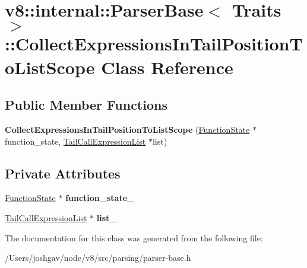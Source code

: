 \hypertarget{classv8_1_1internal_1_1_parser_base_1_1_collect_expressions_in_tail_position_to_list_scope}{}\section{v8\+:\+:internal\+:\+:Parser\+Base$<$ Traits $>$\+:\+:Collect\+Expressions\+In\+Tail\+Position\+To\+List\+Scope Class Reference}
\label{classv8_1_1internal_1_1_parser_base_1_1_collect_expressions_in_tail_position_to_list_scope}
\subsection*{Public Member Functions}
\begin{DoxyCompactItemize}
\item 
{\bfseries Collect\+Expressions\+In\+Tail\+Position\+To\+List\+Scope} (\hyperlink{classv8_1_1internal_1_1_function_state}{Function\+State} $\ast$function\+\_\+state, \hyperlink{classv8_1_1internal_1_1_parser_base_1_1_tail_call_expression_list}{Tail\+Call\+Expression\+List} $\ast$list)\hypertarget{classv8_1_1internal_1_1_parser_base_1_1_collect_expressions_in_tail_position_to_list_scope_a7edcb8e37de61eb181538833760d8982}{}\label{classv8_1_1internal_1_1_parser_base_1_1_collect_expressions_in_tail_position_to_list_scope_a7edcb8e37de61eb181538833760d8982}

\end{DoxyCompactItemize}
\subsection*{Private Attributes}
\begin{DoxyCompactItemize}
\item 
\hyperlink{classv8_1_1internal_1_1_function_state}{Function\+State} $\ast$ {\bfseries function\+\_\+state\+\_\+}\hypertarget{classv8_1_1internal_1_1_parser_base_1_1_collect_expressions_in_tail_position_to_list_scope_a453bc3a3e8499fe106b498f99bc0fc5a}{}\label{classv8_1_1internal_1_1_parser_base_1_1_collect_expressions_in_tail_position_to_list_scope_a453bc3a3e8499fe106b498f99bc0fc5a}

\item 
\hyperlink{classv8_1_1internal_1_1_parser_base_1_1_tail_call_expression_list}{Tail\+Call\+Expression\+List} $\ast$ {\bfseries list\+\_\+}\hypertarget{classv8_1_1internal_1_1_parser_base_1_1_collect_expressions_in_tail_position_to_list_scope_a55c84d2c65eb4144ef74a437eed7b12a}{}\label{classv8_1_1internal_1_1_parser_base_1_1_collect_expressions_in_tail_position_to_list_scope_a55c84d2c65eb4144ef74a437eed7b12a}

\end{DoxyCompactItemize}


The documentation for this class was generated from the following file\+:\begin{DoxyCompactItemize}
\item 
/\+Users/joshgav/node/v8/src/parsing/parser-\/base.\+h\end{DoxyCompactItemize}
